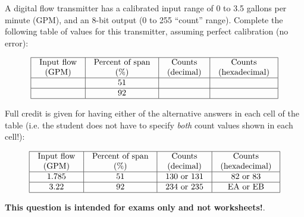 

A digital flow transmitter has a calibrated input range of 0 to 3.5 gallons per minute (GPM), and an 8-bit output (0 to 255 ``count'' range).  Complete the following table of values for this transmitter, assuming perfect calibration (no error):


$$\vbox{\offinterlineskip
\halign{\strut
\vrule \quad\hfil # \ \hfil & 
\vrule \quad\hfil # \ \hfil & 
\vrule \quad\hfil # \ \hfil & 
\vrule \quad\hfil # \ \hfil \vrule \cr
\noalign{\hrule}
%
Input flow & Percent of span & Counts & Counts \cr
%
(GPM) & (\%) & (decimal) & (hexadecimal) \cr
%
\noalign{\hrule}
%
 & 51 &  &  \cr
%
\noalign{\hrule}
%
 & 92 &  &  \cr
%
\noalign{\hrule}
} %
}$$ %







Full credit is given for having either of the alternative answers in each cell of the table (i.e. the student does not have to specify {\it both} count values shown in each cell!):


$$\vbox{\offinterlineskip
\halign{\strut
\vrule \quad\hfil # \ \hfil & 
\vrule \quad\hfil # \ \hfil & 
\vrule \quad\hfil # \ \hfil & 
\vrule \quad\hfil # \ \hfil \vrule \cr
\noalign{\hrule}
%
Input flow & Percent of span & Counts & Counts \cr
%
(GPM) & (\%) & (decimal) & (hexadecimal) \cr
%
\noalign{\hrule}
%
1.785 & 51 & 130 or 131 & 82 or 83 \cr
%
\noalign{\hrule}
%
3.22 & 92 & 234 or 235 & EA or EB \cr
%
\noalign{\hrule}
} %
}$$ %







{\bf This question is intended for exams only and not worksheets!}.



